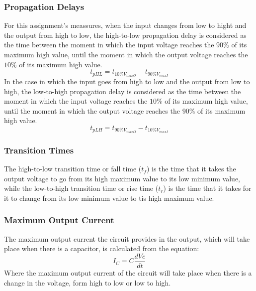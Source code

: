 \subsubsection{\color{red}Propagation Delays}
For this assignment's meassures, when the input changes from low to hight and the output from high to low, the high-to-low propagation delay is considered as the time between the moment in which the input voltage reaches the $90\% $ of its maximum high value, until the moment in which the output voltage reaches the $10\%$ of its maximum high value.
$$t_{pHL} = t_{10\%V_{maxO}} - t_{90\%V_{maxI}}$$
In the case in which the input goes from high to low and the output from low to high, the low-to-high propagation delay is considered as the time between the moment in which the input voltage reaches the $10\%$ of its maximum high value, until the moment in which the output voltage reaches the $90\%$ of its maximum high value.
$$t_{pLH} = t_{90\%V_{maxO}} - t_{10\%V_{maxI}}$$

\subsubsection{\color{red}Transition Times}
The high-to-low transition time or fall time ($t_{f}$) is the time that it takes the output voltage to go from its high maximum value to its low minimum value, while the low-to-high transition time or rise time ($t_{r}$) is the time that it takes for it to change from its low minimum value to tis high maximum value.


\subsubsection {\color{red}Maximum Output Current}
The maximum output current the circuit provides in the output, which will take place when there is a capacitor, is calculated from the equation:
$${I_C}=C\frac{dVc}{dt}$$
Where the maximum output current of the circuit will take place when there is a change in the voltage, form high to low or low to high. 

